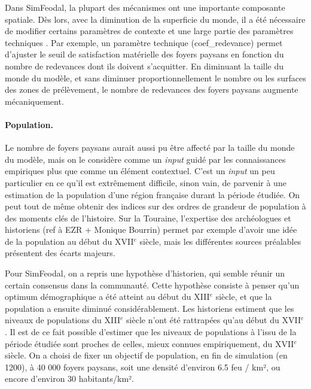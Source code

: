 Dans SimFeodal, la plupart des mécanismes ont une importante composante spatiale.
Dès lors, avec la diminution de la superficie du monde, il a été nécessaire de modifier certains paramètres de contexte et une large partie des paramètres techniques .
Par exemple, un paramètre technique (\textsf{coef\_redevance}) permet d'ajuster le seuil de satisfaction matérielle des foyers paysans en fonction du nombre de redevances dont ils doivent s'acquitter.
En diminuant la taille du monde du modèle, et sans diminuer proportionnellement le nombre ou les surfaces des zones de prélèvement, le nombre de redevances des foyers paysans augmente mécaniquement.

\paragraph{Population.}
Le nombre de foyers paysans aurait aussi pu être affecté par la taille du monde du modèle, mais on le considère comme un \textit{input} guidé par les connaissances empiriques plus que comme un élément contextuel.
C'est un \textit{input} un peu particulier en ce qu'il est extrêmement difficile, sinon vain, de parvenir à une estimation de la population d'une région française durant la période étudiée.
On peut tout de même obtenir des indices sur des ordres de grandeur de population à des moments clés de l'histoire.
Sur la Touraine, l'expertise des archéologues et historiens (ref à EZR + Monique Bourrin) permet par exemple d'avoir une idée de la population au début du XVII$^e$ siècle, mais les différentes sources préalables présentent des écarts majeurs.

Pour SimFeodal, on a repris une hypothèse d'historien, qui semble réunir un certain consensus dans la communauté.
Cette hypothèse consiste à penser qu'un optimum démographique a été atteint au début du XIII$^e$ siècle, et que la population a ensuite diminué considérablement.
Les historiens estiment que les niveaux de populations du XIII$^e$ siècle n'ont été rattrapées qu'au début du XVII$^e$.
Il est de ce fait possible d'estimer que les niveaux de populations à l'issu de la période étudiée sont proches de celles, mieux connues empiriquement, du XVII$^e$ siècle.
On a choisi de fixer un objectif de population, en fin de simulation (en 1200), à 40 000 foyers paysans, soit une densité d'environ 6.5 feu / km², ou encore d'environ 30 habitants/km².



